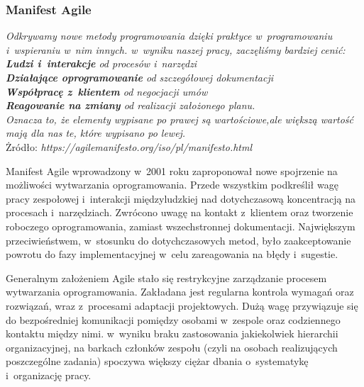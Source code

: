 \documentclass[oneside,polski,logo]{amuthesis}
\begin{document}
\subsubsection{Manifest Agile}
\begin{center}
\textit{Odkrywamy nowe metody programowania dzięki praktyce w~programowaniu i~wspieraniu w~nim innych. w~wyniku naszej pracy, zaczęliśmy bardziej cenić:\\}
\hfill \break
\textit{\textbf{Ludzi i~interakcje} od procesów i~narzędzi\\}
\textit{\textbf{Działające oprogramowanie} od szczegółowej dokumentacji\\}
\textit{\textbf{Współpracę z~klientem} od negocjacji umów\\}
\textit{\textbf{Reagowanie na zmiany} od realizacji założonego planu.\\}
\textit{Oznacza to, że elementy wypisane po prawej są wartościowe,ale większą wartość mają dla nas te, które wypisano po lewej. \\}
\hfill \break
Żródło: \textit{https://agilemanifesto.org/iso/pl/manifesto.html}
\end{center}

Manifest Agile wprowadzony w~2001 roku zaproponował nowe spojrzenie na możliwości wytwarzania oprogramowania. Przede wszystkim podkreślił wagę pracy zespołowej i~interakcji międzyludzkiej nad dotychczasową koncentracją na procesach i~narzędziach. Zwrócono uwagę na kontakt z~klientem oraz tworzenie roboczego oprogramowania, zamiast wszechstronnej dokumentacji. Największym przeciwieństwem, w~stosunku do dotychczasowych metod, było zaakceptowanie powrotu do fazy implementacyjnej w~celu zareagowania na błędy i~sugestie. \cite{agile} \cite{agile2}

Generalnym założeniem Agile stało się restrykcyjne zarządzanie procesem wytwarzania oprogramowania. Zakładana jest regularna kontrola wymagań oraz rozwiązań, wraz z~procesami adaptacji projektowych. Dużą wagę przywiązuje się do bezpośredniej komunikacji pomiędzy osobami w~zespole oraz codziennego kontaktu między nimi. w~wyniku braku zastosowania jakiekolwiek hierarchii organizacyjnej, na barkach członków zespołu (czyli na osobach realizujących poszczególne zadania) spoczywa większy ciężar dbania o~systematykę i~organizację pracy.
\end{document}
